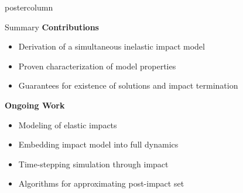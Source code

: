 \documentclass[final,hyperref={pdfpagelabels=false},5pt]{beamer}
\begin{document}
\begin{frame}
\begin{columns}
\begin{column}{.49\textwidth}
\begin{beamercolorbox}[center,wd=\textwidth]{postercolumn}
\begin{minipage}[T]{.95\textwidth}
{             \begin{block}{Summary}
             \textbf{Contributions}
              \begin{itemize}
              \item Derivation of a simultaneous inelastic impact model
              \item Proven characterization of model properties
              \item Guarantees for existence of solutions and impact termination
              \end{itemize}
              \vspace{1ex}
               \textbf{Ongoing Work}             
              \begin{itemize}
              \item Modeling of elastic impacts
              \item Embedding impact model into full dynamics
              \item Time-stepping simulation through impact
              \item Algorithms for approximating post-impact set
              \end{itemize}
            \end{block}
            
          }
        \end{minipage}
      \end{beamercolorbox}
    \end{column}
  \end{columns}
  
%
%
   
\end{frame}
\end{document}
